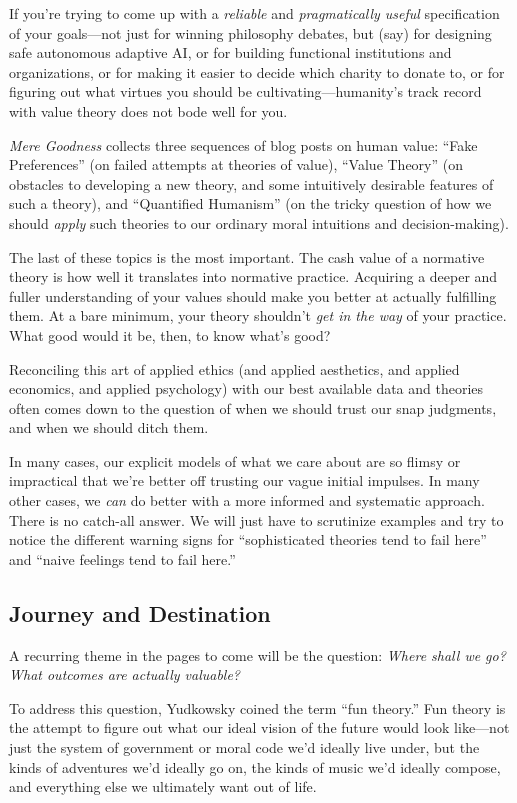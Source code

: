  If you're trying to come up with a
\textit{reliable} and \textit{pragmatically useful} specification of
your goals---not just for winning philosophy debates, but (say) for
designing safe autonomous adaptive AI, or for building functional
institutions and organizations, or for making it easier to decide which
charity to donate to, or for figuring out what virtues you should be
cultivating---humanity's track record with value theory
does not bode well for you.


 \textit{Mere Goodness} collects three sequences of blog posts on
human value: ``Fake Preferences''
(on failed attempts at theories of value), ``Value
Theory'' (on obstacles to developing a new theory,
and some intuitively desirable features of such a theory), and
``Quantified Humanism'' (on the
tricky question of how we should \textit{apply} such theories to our
ordinary moral intuitions and decision-making).


 The last of these topics is the most important. The cash value of
a normative theory is how well it translates into normative practice.
Acquiring a deeper and fuller understanding of your values should make
you better at actually fulfilling them. At a bare minimum, your theory
shouldn't \textit{get in the way} of your practice.
What good would it be, then, to know what's good?


 Reconciling this art of applied ethics (and applied aesthetics,
and applied economics, and applied psychology) with our best available
data and theories often comes down to the question of when we should
trust our snap judgments, and when we should ditch them.


 In many cases, our explicit models of what we care about are so
flimsy or impractical that we're better off trusting
our vague initial impulses. In many other cases, we \textit{can} do
better with a more informed and systematic approach. There is no
catch-all answer. We will just have to scrutinize examples and try to
notice the different warning signs for ``sophisticated
theories tend to fail here'' and
``naive feelings tend to fail
here.''

\subsection{Journey and Destination}


 A recurring theme in the pages to come will be the question:
\textit{Where shall we go? What outcomes are actually valuable?}


 To address this question, Yudkowsky coined the term
``fun theory.'' Fun theory is the
attempt to figure out what our ideal vision of the future would look
like---not just the system of government or moral code
we'd ideally live under, but the kinds of adventures
we'd ideally go on, the kinds of music
we'd ideally compose, and everything else we ultimately
want out of life.

